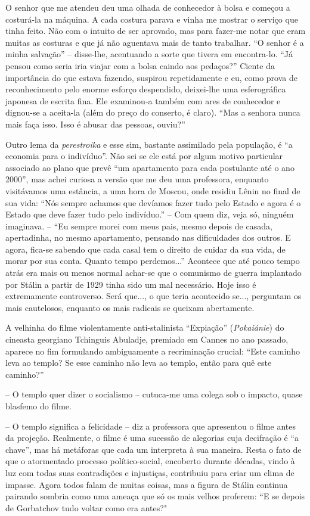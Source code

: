 O senhor que me atendeu deu uma olhada de conhecedor à bolsa e começou a
costurá-la na máquina. A cada costura parava e vinha me mostrar o
serviço que tinha feito. Não com o intuito de ser aprovado, mas para
fazer-me notar que eram muitas as costuras e que já não aguentava mais
de tanto trabalhar. ``O senhor é a minha salvação'' -- disse-lhe,
acentuando a sorte que tivera em encontra-lo. ``Já pensou como seria
iria viajar com a bolsa caindo aos pedaços?'' Ciente da importância do
que estava fazendo, suspirou repetidamente e eu, como prova de
reconhecimento pelo enorme esforço despendido, deixei-lhe uma
esferográfica japonesa de escrita fina. Ele examinou-a também com ares
de conhecedor e dignou-se a aceita-la (além do preço do conserto, é
claro). ``Mas a senhora nunca mais faça isso. Isso é abusar das pessoas,
ouviu?''

Outro lema da \emph{perestroika} e esse sim, bastante assimilado pela
população, é ``a economia para o indivíduo''. Não sei se ele está por
algum motivo particular associado ao plano que prevê ``um apartamento
para cada postulante até o ano 2000'', mas achei curiosa a versão que me
deu uma professora, enquanto visitávamos uma estância, a uma hora de
Moscou, onde residiu Lênin no final de sua vida: ``Nós sempre achamos
que devíamos fazer tudo pelo Estado e agora é o Estado que deve fazer
tudo pelo indivíduo.'' -- Com quem diz, veja só, ninguém imaginava. --
``Eu sempre morei com meus pais, mesmo depois de casada, apertadinha, no
mesmo apartamento, pensando nas dificuldades dos outros. E agora,
fica-se sabendo que cada casal tem o direito de cuidar da sua vida, de
morar por sua conta. Quanto tempo perdemos...'' Acontece que até pouco
tempo atrás era mais ou menos normal achar-se que o comunismo de guerra
implantado por Stálin a partir de 1929 tinha sido um mal necessário.
Hoje isso é extremamente controverso. Será que..., o que teria
acontecido se..., perguntam os mais cautelosos, enquanto os mais
radicais se queixam abertamente.

A velhinha do filme violentamente anti-stalinista ``Expiação''
(\emph{Pokaiánie}) do cineasta georgiano Tchinguis Abuladje, premiado em
Cannes no ano passado, aparece no fim formulando ambiguamente a
recriminação crucial: ``Este caminho leva ao templo? Se esse caminho não
leva ao templo, então para quê este caminho?''

-- O templo quer dizer o socialismo -- cutuca-me uma colega sob o
impacto, quase blasfemo do filme.

-- O templo significa a felicidade -- diz a professora que apresentou o
filme antes da projeção. Realmente, o filme é uma sucessão de alegorias
cuja decifração é ``a chave'', mas há metáforas que cada um interpreta à
sua maneira. Resta o fato de que o atormentado processo político-social,
encoberto durante décadas, vindo à luz com todas suas contradições e
injustiças, contribuiu para criar um clima de impasse. Agora todos falam
de muitas coisas, mas a figura de Stálin continua pairando sombria como
uma ameaça que só os mais velhos proferem: ``E se depois de Gorbatchov
tudo voltar como era antes?"

